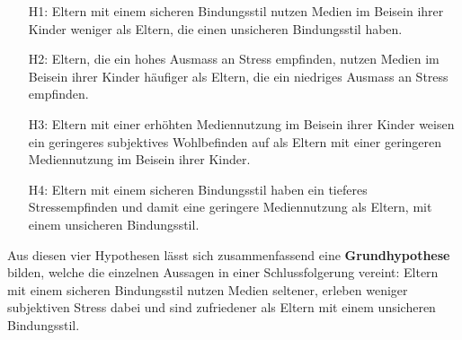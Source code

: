 \begin{itemize}
  \item[H1:] Eltern mit einem sicheren Bindungsstil nutzen Medien im Beisein ihrer Kinder weniger als Eltern, die einen unsicheren Bindungsstil haben.
  \item[H2:] Eltern, die ein hohes Ausmass an Stress empfinden, nutzen Medien im Beisein ihrer Kinder häufiger als Eltern, die ein niedriges Ausmass an Stress empfinden.
  \item [H3:] Eltern mit einer erhöhten Mediennutzung im Beisein ihrer Kinder weisen ein geringeres subjektives Wohlbefinden auf als Eltern mit einer geringeren Mediennutzung im Beisein ihrer Kinder.
  \item [H4:] Eltern mit einem sicheren Bindungsstil haben ein tieferes Stressempfinden und damit eine geringere Mediennutzung als Eltern, mit einem unsicheren Bindungsstil.
\end{itemize}

Aus diesen vier Hypothesen lässt sich zusammenfassend eine \textbf{Grundhypothese} bilden, welche die einzelnen Aussagen in einer Schlussfolgerung vereint: Eltern mit einem sicheren Bindungsstil nutzen Medien seltener, erleben weniger subjektiven Stress dabei und sind zufriedener als Eltern mit einem unsicheren Bindungsstil.
